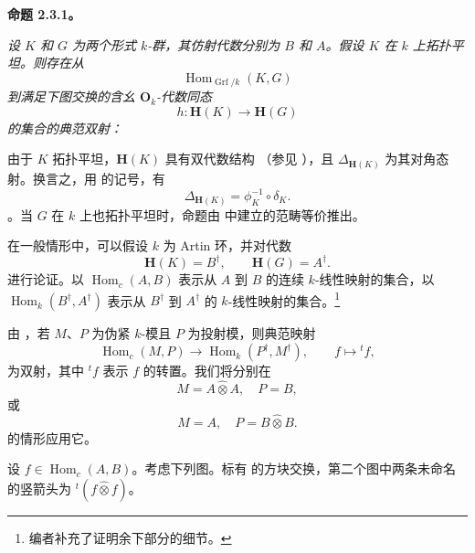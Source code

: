 \medskip\noindent\textbf{命题 2.3.1。} \label{sga3:VIIB:2.3.1}{\itshape 设 \(K\) 和 \(G\) 为两个形式 \(k\)-群，其仿射代数分别为 \(B\) 和 \(A\)。假设 \(K\) 在 \(k\) 上拓扑平坦。则存在从 \[
  \operatorname{Hom}_{\operatorname{Grf}/k}(K,G)
\] 到满足下图交换的含幺 \(\mathbf O_k\)-代数同态 \[
  h:\mathbf H(K)\longrightarrow\mathbf H(G)
\] 的集合的典范双射：\begin{center} \label{sga3:VIIB:2.3.1:compatibility-diagram} \end{center}}

由于 \(K\) 拓扑平坦，\(\mathbf H(K)\) 具有双代数结构 \textup{（参见 ）}，且 \(\Delta_{\mathbf H(K)}\) 为其对角态射。换言之，用  的记号，有 \[
  \Delta_{\mathbf H(K)}=\phi_K^{-1}\circ\delta_K.
\]。当 \(G\) 在 \(k\) 上也拓扑平坦时，命题由  中建立的范畴等价推出。

在一般情形中，可以假设 \(k\) 为 Artin 环，并对代数 \[
  \mathbf H(K)=B^\dagger,
  \qquad
  \mathbf H(G)=A^\dagger.
\] 进行论证。以 \(\operatorname{Hom}_c(A,B)\) 表示从 \(A\) 到 \(B\) 的连续 \(k\)-线性映射的集合，以 \(\operatorname{Hom}_k(B^\dagger,A^\dagger)\) 表示从 \(B^\dagger\) 到 \(A^\dagger\) 的 \(k\)-线性映射的集合。\footnote{\label{sga3:VIIB:nde:87}编者补充了证明余下部分的细节。}

由 ，若 \(M\)、\(P\) 为伪紧 \(k\)-模且 \(P\) 为投射模，则典范映射 \[
  \operatorname{Hom}_c(M,P)
  \longrightarrow
  \operatorname{Hom}_k(P^\dagger,M^\dagger),
  \qquad
  f\longmapsto{}^t f,
\] 为双射，其中 \({}^t f\) 表示 \(f\) 的转置。我们将分别在 \[
  M=A\widehat\otimes A,\quad P=B,
\] 或 \[
  M=A,\quad P=B\widehat\otimes B.
\] 的情形应用它。

设 \(f\in\operatorname{Hom}_c(A,B)\)。考虑下列图。标有 \textup{} 的方块交换，第二个图中两条未命名的竖箭头为 \({}^t(f\widehat\otimes f)\)。\begin{center} \label{sga3:VIIB:2.3.1:affine-diagram} 

  \medskip
  \label{sga3:VIIB:2.3.1:dual-diagram}
  
\end{center}

